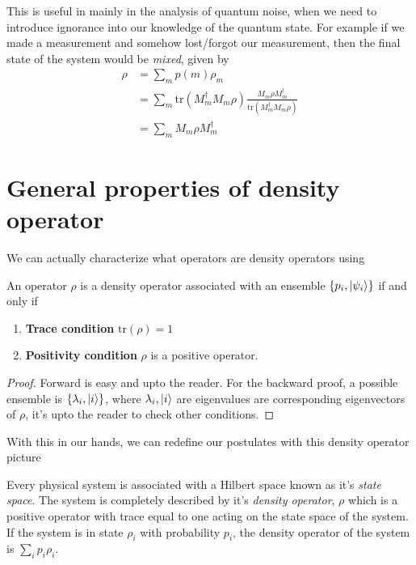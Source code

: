 This is useful in mainly in the analysis of quantum noise, when we need to introduce ignorance into our knowledge of the quantum state. For example if we made a measurement and somehow lost/forgot our measurement, then the final state of the system would be \textit{mixed}, given by
\begin{align}
    \rho &= \sum_m p(m)\rho_m \\
    &= \sum_m \text{tr}(M_m^\dag M_m \rho)
    \frac{M_m\rho M_m^\dag}{\text{tr}(M_m^\dag M_m \rho)} \\
    &= \sum_m M_m \rho M_m^\dag
\end{align}

\section{General properties of density operator}
We can actually characterize what operators are density operators using

\begin{theorem}
    An operator $\rho$ is a density operator associated with an ensemble $\{p_i, \ket{\psi_i}\}$ if and only if
    \begin{enumerate}
        \item \textbf{Trace condition} $\text{tr}(\rho) = 1$
        \item \textbf{Positivity condition} $\rho$ is a positive operator.
    \end{enumerate}
\end{theorem}
\begin{proof}
    Forward is easy and upto the reader. For the backward proof, a possible ensemble is $\{ \lambda_i, \ket{i}\}$, where $\lambda_i, \ket{i}$ are eigenvalues are corresponding eigenvectors of $\rho$, it's upto the reader to check other conditions.
\end{proof}

With this in our hands, we can redefine our postulates with this density operator picture 
\begin{postulate*}
    Every physical system is associated with a Hilbert space known as it's \textit{state space}. The system is completely described by it's \textit{density operator}, $\rho$ which is a positive operator with trace equal to one acting on the state space of the system. If the system is in state $\rho_i$ with probability $p_i$, the density operator of the system is $\sum_i p_i\rho_i$.
\end{postulate*}

